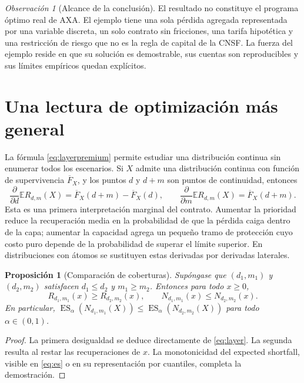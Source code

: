 \documentclass[11pt,reqno]{amsart}
\newtheorem{proposition}[theorem]{Proposición}
\theoremstyle{definition}\newtheorem{definition}[theorem]{Definición}
\theoremstyle{remark}\newtheorem{remark}[theorem]{Observación}
\DeclareMathOperator{\ES}{ES}
\newcommand{\E}{\mathbb E}
\begin{document}
\begin{remark}[Alcance de la conclusión]
El resultado no constituye el programa óptimo real de AXA. El ejemplo tiene una sola pérdida agregada representada por una variable discreta, un solo contrato sin fricciones, una tarifa hipotética y una restricción de riesgo que no es la regla de capital de la CNSF. La fuerza del ejemplo reside en que su solución es demostrable, sus cuentas son reproducibles y sus límites empíricos quedan explícitos.
\end{remark}

\section{Una lectura de optimización más general}
La fórmula \eqref{eq:layerpremium} permite estudiar una distribución continua sin enumerar todos los escenarios. Si $X$ admite una distribución continua con función de supervivencia $\overline F_X$, y los puntos $d$ y $d+m$ son puntos de continuidad, entonces
\begin{equation}\label{eq:partials}
\frac{\partial}{\partial d}\E R_{d,m}(X)=\overline F_X(d+m)-\overline F_X(d),\qquad
\frac{\partial}{\partial m}\E R_{d,m}(X)=\overline F_X(d+m).
\end{equation}
Esta es una primera interpretación marginal del contrato. Aumentar la prioridad reduce la recuperación media en la probabilidad de que la pérdida caiga dentro de la capa; aumentar la capacidad agrega un pequeño tramo de protección cuyo costo puro depende de la probabilidad de superar el límite superior. En distribuciones con átomos se sustituyen estas derivadas por derivadas laterales.

\begin{proposition}[Comparación de coberturas]\label{prop:order}
Supóngase que $(d_1,m_1)$ y $(d_2,m_2)$ satisfacen $d_1\le d_2$ y $m_1\ge m_2$. Entonces para todo $x\ge0$,
\[
R_{d_1,m_1}(x)\ge R_{d_2,m_2}(x),\qquad
N_{d_1,m_1}(x)\le N_{d_2,m_2}(x).
\]
En particular, $\ES_\alpha(N_{d_1,m_1}(X))\le\ES_\alpha(N_{d_2,m_2}(X))$ para todo $\alpha\in(0,1)$.
\end{proposition}
\begin{proof}
La primera desigualdad se deduce directamente de \eqref{eq:layer}. La segunda resulta al restar las recuperaciones de $x$. La monotonicidad del expected shortfall, visible en \eqref{eq:es} o en su representación por cuantiles, completa la demostración.
\end{proof}
\end{document}
